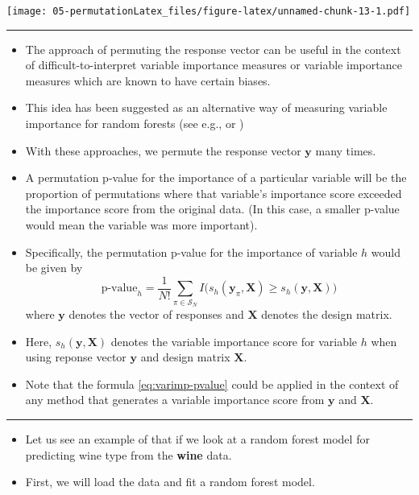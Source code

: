 \documentclass[]{book}
\begin{document}
\texttt{[image: 05-permutationLatex\_files/figure-latex/unnamed-chunk-13-1.pdf]}

\begin{center}\rule{0.5\linewidth}{\linethickness}\end{center}

\begin{itemize}
\item
  The approach of permuting the response vector can be useful in the context of difficult-to-interpret
  variable importance measures or variable importance measures which
  are known to have certain biases.
\item
  This idea has been suggested as an alternative way of
  measuring variable importance for random forests (see e.g., \citet{altmann2010}
  or \citet{nembrini2019})
\item
  With these approaches, we permute the response vector \(\mathbf{y}\) many times.
\item
  A permutation p-value for the importance of a particular variable will be the proportion of
  permutations where that variable's importance score exceeded the importance score from the original data.
  (In this case, a smaller p-value would mean the variable was more important).
\item
  Specifically, the permutation p-value for the importance of variable \(h\) would be given by
  \begin{equation}
  \textrm{p-value}_{h} = \frac{1}{N!}\sum_{\pi \in \mathcal{S}_{N}} I\Big( s_{h}(\mathbf{y}_{\pi}, \mathbf{X})  \geq s_{h}(\mathbf{y}, \mathbf{X}) \Big)
  \label{eq:varimp-pvalue}
  \end{equation}
  where \(\mathbf{y}\) denotes the vector of responses and \(\mathbf{X}\) denotes the design matrix.
\item
  Here, \(s_{h}(\mathbf{y}, \mathbf{X})\) denotes the variable importance score for variable \(h\)
  when using reponse vector \(\mathbf{y}\) and design matrix \(\mathbf{X}\).
\item
  Note that the formula \eqref{eq:varimp-pvalue} could be applied in the context of
  any method that generates a variable importance score
  from \(\mathbf{y}\) and \(\mathbf{X}\).
\end{itemize}

\begin{center}\rule{0.5\linewidth}{\linethickness}\end{center}

\begin{itemize}
\item
  Let us see an example of that if we look at a random forest model for predicting wine type from
  the \textbf{wine} data.
\item
  First, we will load the data and fit a random forest model.
\end{itemize}
\end{document}
